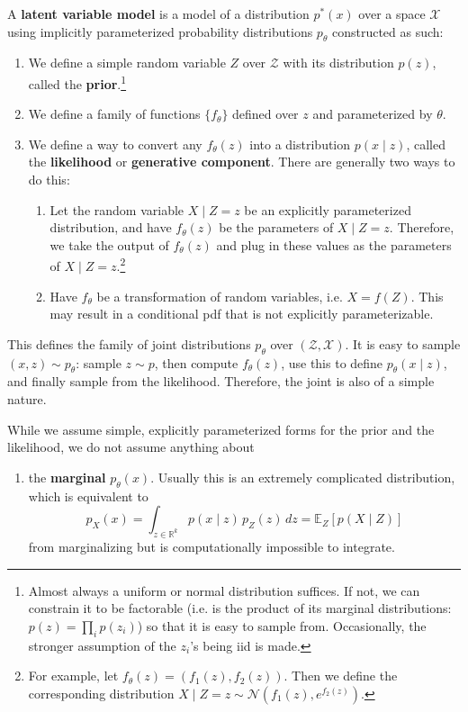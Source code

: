   \begin{definition}
    A \textbf{latent variable model} is a model of a distribution $p^\ast (x)$ over a space $\mathcal{X}$ using implicitly parameterized probability distributions $p_\theta$ constructed as such: 
    \begin{enumerate}
      \item We define a simple random variable $Z$ over $\mathcal{Z}$ with its distribution $p(z)$, called the \textbf{prior}.\footnote{Almost always a uniform or normal distribution suffices. If not, we can constrain it to be factorable (i.e. is the product of its marginal distributions: $p(z) = \prod_i p(z_i)$) so that it is easy to sample from. Occasionally, the stronger assumption of the $z_i$'s being iid is made. } 
      \item We define a family of functions $\{f_\theta\}$ defined over $z$ and parameterized by $\theta$. 
      \item We define a way to convert any $f_\theta(z)$ into a distribution $p(x \mid z)$, called the \textbf{likelihood} or \textbf{generative component}. There are generally two ways to do this: 
      \begin{enumerate}
        \item Let the random variable $X \mid Z = z$ be an explicitly parameterized distribution, and have $f_\theta (z)$ be the parameters of $X \mid Z = z$. Therefore, we take the output of $f_\theta (z)$ and plug in these values as the parameters of $X \mid Z = z$.\footnote{For example, let $f_\theta (z) = (f_1 (z), f_2(z))$. Then we define the corresponding distribution $X \mid Z = z \sim \mathcal{N}(f_1 (z), e^{f_2 (z)} )$.}
        \item Have $f_\theta$ be a transformation of random variables, i.e. $X = f(Z)$. This may result in a conditional pdf that is not explicitly parameterizable.
      \end{enumerate}
    \end{enumerate}
    This defines the family of joint distributions $p_\theta$ over $(\mathcal{Z}, \mathcal{X})$. It is easy to sample $(x, z) \sim p_\theta$: sample $z \sim p$, then compute $f_\theta (z)$, use this to define $p_\theta (x \mid z)$, and finally sample from the likelihood. Therefore, the joint is also of a simple nature. 

    While we assume simple, explicitly parameterized forms for the prior and the likelihood, we do not assume anything about 
    \begin{enumerate}
      \item the \textbf{marginal} $p_\theta (x)$. Usually this is an extremely complicated distribution, which is equivalent to 
      \begin{equation} 
        p_X (x) = \int_{z \in \mathbb{R}^k} p (x \mid z) \, p_Z (z) \,dz = \mathbb{E}_Z [p(X \mid Z)] 
      \end{equation} 
      from marginalizing but is computationally impossible to integrate. 


\end{enumerate}
\end{definition}
